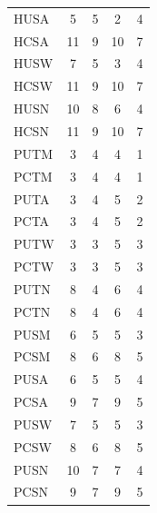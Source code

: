 \documentclass{svjour3}
\theoremstyle{break}
\begin{document}
\begin{table}
\begin{center}
{{{\begin{tabular}{l@{~~~}|c@{~~~}c@{~~~}c@{~~~}c}
\hline
HUSA &\cellcolor{green!40} 5 & \cellcolor{green!40}5 & \cellcolor{green!40}2 & \cellcolor{green!40}4\\
HCSA & 11 & 9 & 10 & 7\\
\hline
HUSW & \cellcolor{green!40}7 & \cellcolor{green!40}5 &\cellcolor{green!40} 3 &\cellcolor{green!40} 4\\
HCSW & 11 & 9 & 10 & 7\\
\hline
HUSN &\cellcolor{green!40} 10 &\cellcolor{green!40} 8 &\cellcolor{green!40} 6 &\cellcolor{green!40} 4\\
HCSN & 11 & 9 & 10 & 7\\
\hline
PUTM & 3 & 4 & 4 & 1\\
PCTM & 3 & 4 & 4 & 1\\
\hline
PUTA & 3 & 4 & 5 & 2\\
PCTA & 3 & 4 & 5 & 2\\
\hline
PUTW & 3 & 3 & 5 & 3\\
PCTW & 3 & 3 & 5 & 3\\
\hline
PUTN & 8 & 4 & 6 & 4\\
PCTN & 8 & 4 & 6 & 4\\
\hline
PUSM & \cellcolor{green!40}6 & \cellcolor{green!40}5 &\cellcolor{green!40} 5 &\cellcolor{green!40} 3\\
PCSM & 8 & 6 & 8 & 5\\
\hline
PUSA &\cellcolor{green!40} 6 &\cellcolor{green!40} 5 & \cellcolor{green!40}5 &\cellcolor{green!40} 4\\
PCSA & 9 & 7 & 9 & 5\\
\hline
PUSW &\cellcolor{green!40} 7 &\cellcolor{green!40} 5 &\cellcolor{green!40} 5 &\cellcolor{green!40} 3\\
PCSW & 8 & 6 & 8 & 5\\
\hline
PUSN & \cellcolor{blue!50}10 & 7 & \cellcolor{green!40}7 &\cellcolor{green!40} 4\\
PCSN & 9 & 7 & 9 & 5\\
\hline
\end{tabular}}
}}


\end{center}
\end{table}
\end{document}
